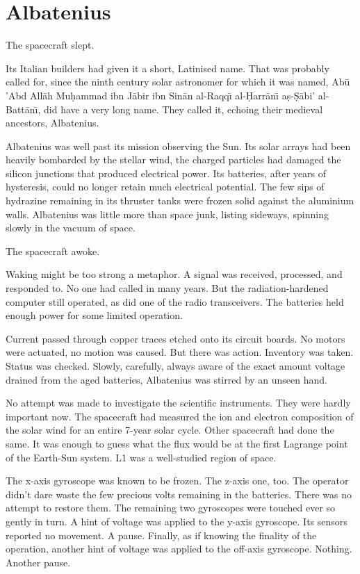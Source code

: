 %
%

\chapter{Albatenius}

The spacecraft slept.

Its Italian builders had given it a short, Latinised name. That was probably called for, since the ninth century solar astronomer for which it was named, Ab\=u 'Abd All\={a}h Mu\d{h}ammad ibn J\={a}bir ibn Sin\={a}n al-Raqq\=\i{} al-\d{H}arr\={a}n\=\i{} a\d{s}-\d{S}\={a}bi' al-Batt\={a}n\=\i{}, did have a very long name. They called it, echoing their medieval ancestors, Albatenius.

Albatenius was well past its mission observing the Sun. Its solar arrays had been heavily bombarded by the stellar wind, the charged particles had damaged the silicon junctions that produced electrical power. Its batteries, after years of hysteresis, could no longer retain much electrical potential. The few sips of hydrazine remaining in its thruster tanks were frozen solid against the aluminium walls. Albatenius was little more than space junk, listing sideways, spinning slowly in the vacuum of space.

The spacecraft awoke.

Waking might be too strong a metaphor. A signal was received, processed, and responded to. No one had called in many years. But the radiation-hardened computer still operated, as did one of the radio transceivers. The batteries held enough power for some limited operation.

Current passed through copper traces etched onto its circuit boards. No motors were actuated, no motion was caused. But there was action. Inventory was taken. Status was checked. Slowly, carefully, always aware of the exact amount voltage drained from the aged batteries, Albatenius was stirred by an unseen hand.

No attempt was made to investigate the scientific instruments. They were hardly important now. The spacecraft had measured the ion and electron composition of the solar wind for an entire 7-year solar cycle. Other spacecraft had done the same. It was enough to guess what the flux would be at the first Lagrange point of the Earth-Sun system. L1 was a well-studied region of space.

The x-axis gyroscope was known to be frozen. The z-axis one, too. The operator didn't dare waste the few precious volts remaining in the batteries. There was no attempt to restore them. The remaining two gyroscopes were touched ever so gently in turn. A hint of voltage was applied to the y-axis gyroscope. Its sensors reported no movement. A pause. Finally, as if knowing the finality of the operation, another hint of voltage was applied to the off-axis gyroscope. Nothing. Another pause.


